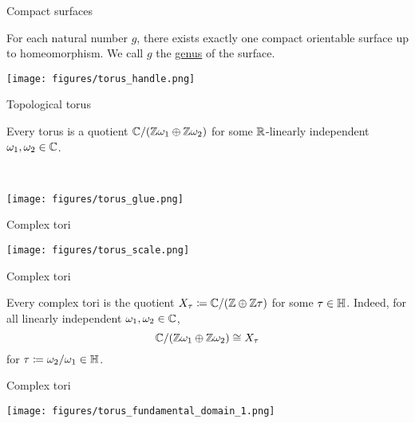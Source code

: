 \documentclass{beamer}
\begin{document}
    \begin{frame}{Compact surfaces}
        \begin{theorem}
            For each natural number $g$, there exists exactly one compact orientable surface up to homeomorphism. We call $g$ the \ul{genus} of the surface.
        \end{theorem}

        \pause

        \begin{center}
            \texttt{[image: figures/torus\_handle.png]}
        \end{center}
    \end{frame}
    \begin{frame}{Topological torus}
        \begin{theorem}
            Every torus is a quotient $\mathbb{C}/\!\left(\mathbb{Z}\omega_1\oplus\mathbb{Z}\omega_2\right)$ for some $\mathbb{R}$-linearly independent $\omega_1,\omega_2\in\mathbb{C}$.
        \end{theorem}

        \pause\ \\

        \begin{center}
            \texttt{[image: figures/torus\_glue.png]}
        \end{center}
    \end{frame}
    \begin{frame}{Complex tori}
        \begin{center}
            \texttt{[image: figures/torus\_scale.png]}
        \end{center}
    \end{frame}
    \begin{frame}{Complex tori}
        \begin{theorem}
            Every complex tori is the quotient $X_\tau\coloneqq\mathbb{C}/\!\left(\mathbb{Z}\oplus\mathbb{Z}\tau\right)$ for some $\tau\in\mathbb{H}$. Indeed, for all linearly independent $\omega_1,\omega_2\in\mathbb{C}$,
            \begin{equation*}
                \mathbb{C}/\!\left(\mathbb{Z}\omega_1\oplus\mathbb{Z}\omega_2\right)\cong X_\tau
            \end{equation*}
            for $\tau\coloneqq\omega_2/\omega_1\in\mathbb{H}$.
        \end{theorem}
    \end{frame}
    \begin{frame}{Complex tori}
        \begin{center}
            \texttt{[image: figures/torus\_fundamental\_domain\_1.png]}
        \end{center}
    \end{frame}
\end{document}
